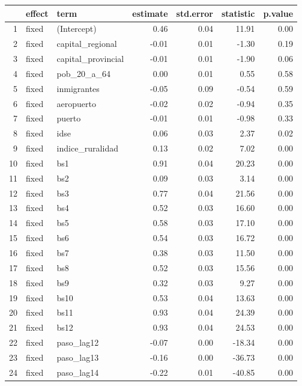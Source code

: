 \begin{table}[ht]
\centering
\begin{tabular}{rllrrrr}
  \hline
 & effect & term & estimate & std.error & statistic & p.value \\ 
  \hline
1 & fixed & (Intercept) & 0.46 & 0.04 & 11.91 & 0.00 \\ 
  2 & fixed & capital\_regional & -0.01 & 0.01 & -1.30 & 0.19 \\ 
  3 & fixed & capital\_provincial & -0.01 & 0.01 & -1.90 & 0.06 \\ 
  4 & fixed & pob\_20\_a\_64 & 0.00 & 0.01 & 0.55 & 0.58 \\ 
  5 & fixed & inmigrantes & -0.05 & 0.09 & -0.54 & 0.59 \\ 
  6 & fixed & aeropuerto & -0.02 & 0.02 & -0.94 & 0.35 \\ 
  7 & fixed & puerto & -0.01 & 0.01 & -0.98 & 0.33 \\ 
  8 & fixed & idse & 0.06 & 0.03 & 2.37 & 0.02 \\ 
  9 & fixed & indice\_ruralidad & 0.13 & 0.02 & 7.02 & 0.00 \\ 
  10 & fixed & bs1 & 0.91 & 0.04 & 20.23 & 0.00 \\ 
  11 & fixed & bs2 & 0.09 & 0.03 & 3.14 & 0.00 \\ 
  12 & fixed & bs3 & 0.77 & 0.04 & 21.56 & 0.00 \\ 
  13 & fixed & bs4 & 0.52 & 0.03 & 16.60 & 0.00 \\ 
  14 & fixed & bs5 & 0.58 & 0.03 & 17.10 & 0.00 \\ 
  15 & fixed & bs6 & 0.54 & 0.03 & 16.72 & 0.00 \\ 
  16 & fixed & bs7 & 0.38 & 0.03 & 11.50 & 0.00 \\ 
  17 & fixed & bs8 & 0.52 & 0.03 & 15.56 & 0.00 \\ 
  18 & fixed & bs9 & 0.32 & 0.03 & 9.27 & 0.00 \\ 
  19 & fixed & bs10 & 0.53 & 0.04 & 13.63 & 0.00 \\ 
  20 & fixed & bs11 & 0.93 & 0.04 & 24.39 & 0.00 \\ 
  21 & fixed & bs12 & 0.93 & 0.04 & 24.53 & 0.00 \\ 
  22 & fixed & paso\_lag12 & -0.07 & 0.00 & -18.34 & 0.00 \\ 
  23 & fixed & paso\_lag13 & -0.16 & 0.00 & -36.73 & 0.00 \\ 
  24 & fixed & paso\_lag14 & -0.22 & 0.01 & -40.85 & 0.00 \\ 

\end{tabular}
\end{table}

